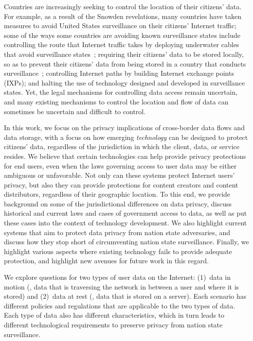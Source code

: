 Countries are increasingly seeking to control the location of their citizens'
data. For example, as a result of the Snowden revelations, many countries have
taken measures to avoid United States surveillance on their citizens' Internet
traffic; some of the ways some countries are avoiding known surveillance
states include controlling the route  that Internet traffic takes by deploying
underwater cables that avoid surveillance states~\cite{brazil}; requiring
their citizens' data to be stored locally, so as to prevent their citizens'
data from  being stored in a country that conducts surveillance~\cite{russia};
controlling Internet paths by building Internet exchange points (IXPs); and
halting the use of technology designed and developed in surveillance states.
Yet, the legal mechanisms for controlling data access remain uncertain, and
many existing mechanisms to control the location and flow of data can
sometimes be uncertain and difficult to control.


In this work, we focus on the privacy implications of cross-border data flows
and data storage, with a focus on how emerging {\em technology} can be
designed to protect citizens' data, regardless of the  jurisdiction in which
the client, data, or service resides. We believe that certain technologies can
help provide privacy protections for end users, even when the laws governing
access to user data may be either ambiguous or unfavorable. Not only can these
systems protect Internet users' privacy, but also they can  provide
protections  for content creators and content distributors, regardless of
their geographic location. To this end, we provide background on some of the
jurisdictional differences on data privacy, discuss historical and current
laws and cases of  government access to data, as well as put these cases into
the context  of technology development. We also highlight current systems that
aim to protect data privacy from nation  state adversaries, and discuss how
they stop short of circumventing nation state surveillance.  Finally, we
highlight various aspects where existing technology fails to provide adequate
protection, and highlight new avenues for future work in this regard.

We explore questions for two types of user data on the Internet: (1)~data in
motion (\ie, data that is traversing the network in between a user and where
it is stored) and (2)~data at rest (\ie, data that is stored on a server).
Each scenario has different policies and regulations that are applicable to
the two types of data.  Each type of data also has different characteristics,
which in turn leads to different technological requirements to preserve
privacy from nation state surveillance.

